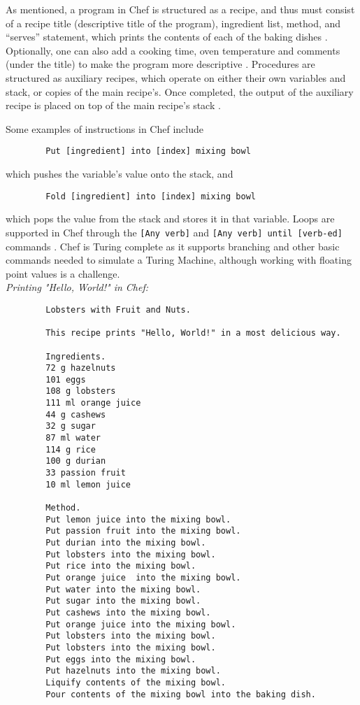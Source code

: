 \documentclass{article}
\begin{document}
\begin{enumerate}
    As mentioned, a program in Chef is structured as a recipe, and thus must consist of a recipe title (descriptive title of the program), ingredient list, method, and “serves” statement, which prints the contents of each of the baking dishes \cite{Progopedia_2011}. Optionally, one can also add a cooking time, oven temperature and comments (under the title) to make the program more descriptive \cite{Progopedia_2011}. Procedures are structured as auxiliary recipes, which operate on either their own variables and stack, or copies of the main recipe’s. Once completed, the output of the auxiliary recipe is placed on top of the main recipe’s stack \cite{Progopedia_2011}.
    
    Some examples of instructions in Chef include \begin{verbatim}
        Put [ingredient] into [index] mixing bowl
    \end{verbatim} which pushes the variable’s value onto the stack, and \begin{verbatim}
        Fold [ingredient] into [index] mixing bowl
    \end{verbatim} which pops the value from the stack and stores it in that variable. Loops are supported in Chef through the \verb|[Any verb]| and \verb|[Any verb] until [verb-ed]| commands \cite{Progopedia_2011}. Chef is Turing complete as it supports branching and other basic commands needed to simulate a Turing Machine, although working with floating point values is a challenge. \\
    
    \textit{Printing "Hello, World!" in Chef:}
    \begin{verbatim}
        Lobsters with Fruit and Nuts.
        
        This recipe prints "Hello, World!" in a most delicious way.
        
        Ingredients.
        72 g hazelnuts
        101 eggs
        108 g lobsters
        111 ml orange juice
        44 g cashews
        32 g sugar
        87 ml water
        114 g rice
        100 g durian
        33 passion fruit
        10 ml lemon juice
        
        Method.
        Put lemon juice into the mixing bowl.
        Put passion fruit into the mixing bowl.
        Put durian into the mixing bowl.
        Put lobsters into the mixing bowl.
        Put rice into the mixing bowl.
        Put orange juice  into the mixing bowl.
        Put water into the mixing bowl.
        Put sugar into the mixing bowl.
        Put cashews into the mixing bowl.
        Put orange juice into the mixing bowl.
        Put lobsters into the mixing bowl.
        Put lobsters into the mixing bowl.
        Put eggs into the mixing bowl.
        Put hazelnuts into the mixing bowl.
        Liquify contents of the mixing bowl.
        Pour contents of the mixing bowl into the baking dish.
        

\end{verbatim}
\end{enumerate}
\end{document}
